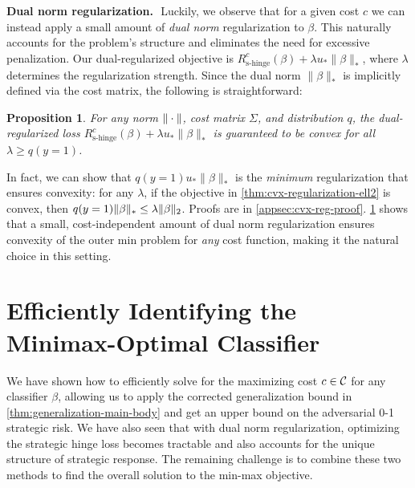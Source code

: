 \documentclass{article}
\newcommand{\costmatrix}{\Sigma}
\newcommand{\costset}{\gC}
\newcommand{\costfunc}{c}
\newcommand{\shingepoprisk}{R_{\textrm{s-hinge}}}
\newcommand{\uinv}{\ensuremath{u_{*}}}
\newcommand{\dualnorm}[1]{\|#1\|_{*}}
\newcommand{\cinc}{{\costfunc\in\costset}}
\newtheorem{proposition}[theorem]{Proposition}
\theoremstyle{definition}
\renewcommand{\paragraph}[1]{{\textbf{#1}\,\,}}
\begin{document}
\paragraph{Dual norm regularization.}
Luckily, we observe that for a given cost $\costfunc$ we can instead apply a small amount of \emph{dual norm} regularization to $\beta$. This naturally accounts for the problem's structure and eliminates the need for excessive penalization.
Our dual-regularized objective is
    $\shingepoprisk^c(\beta) + \lambda \uinv \dualnorm{\beta}$,
where $\lambda$ determines the regularization strength.
Since the dual norm $\dualnorm{\beta}$ is implicitly defined via the cost matrix,
the following is straightforward: %
\begin{proposition}
    \label{thm:cvx-regularization1}
    For any norm $\| \cdot \|$, cost matrix $\costmatrix$, and distribution $q$,
    the dual-regularized loss $\shingepoprisk^c(\beta) + \lambda \uinv \dualnorm{\beta}$ is guaranteed to be convex for all $\lambda \geq q(y=1)$.
\end{proposition}
In fact, we can show that $q(y=1) \uinv \dualnorm{\beta}$ is the \emph{minimum} regularization that ensures convexity: for any $\lambda$, if the objective in \cref{thm:cvx-regularization-ell2} is convex, then $q(y=1) \dualnorm{\beta} \leq \lambda \twonorm{\beta}$. Proofs are in \cref{appsec:cvx-reg-proof}.
\cref{thm:cvx-regularization1} shows that a small, cost-independent amount of dual norm regularization ensures convexity of the outer min problem for \emph{any} cost function, making it the natural choice in this setting.

\section{Efficiently Identifying the Minimax-Optimal Classifier}

We have shown how to efficiently solve for the maximizing cost $\cinc$ for any classifier $\beta$, allowing us to apply the corrected generalization bound in \cref{thm:generalization-main-body} and get an upper bound on the adversarial 0-1 strategic risk. We have also seen that with dual norm regularization, optimizing the strategic hinge loss becomes tractable and also accounts for the unique structure of strategic response.
The remaining challenge is to combine these two methods to find the overall solution to the min-max objective.
\end{document}
